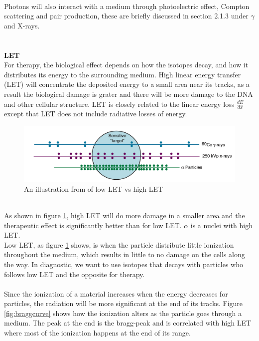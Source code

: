 \documentclass[twoside,english]{uiofysmaster/uiofysmaster}
\begin{document}
\\
Photons will also interact with a medium through photoelectric effect, Compton scattering and pair production, these are briefly discussed in section 2.1.3 under $\gamma$ and X-rays.\\
\\
\\
\noindent
\textbf{LET}\\
For therapy, the biological effect depends on how the isotopes decay, and how it distributes its energy to the surrounding medium. High linear energy transfer (LET) will concentrate the deposited energy to a small area near its tracks, as a result the biological damage is grater and there will be more damage to the DNA and other cellular structure. LET is closely related to the linear energy loss $\frac{dE}{dx}$ except that LET does not include radiative losses of energy. \\
\begin{figure}[h]
    \centering
    \includegraphics[scale=.4]{low_vs_high_LET.PNG}
    \caption{An illustration from \cite{Zeman2015_chap1} of low LET vs high LET}
    \label{fig:higvslowLET}
\end{figure}
\\
As shown in figure \ref{fig:higvslowLET}, high LET will do more damage in a smaller area and the therapeutic effect is significantly better than for low LET. $\alpha$ is a nuclei with high LET. \\
Low LET, as figure \ref{fig:higvslowLET} shows, is when the particle distribute little ionization throughout the medium, which results in little to no damage on the cells along the way. In diagnostic, we want to use isotopes that decays with particles who follows low LET and the opposite for therapy.\\
\\
Since the ionization of a material increases when the energy decreases for particles\cite{Nuclear_medicine}, the radiation will be more significant at the end of its tracks. Figure \ref{fig:braggcurve} shows how the ionization alters as the particle goes through a medium. The peak at the end is the bragg-peak and is correlated with high LET where most of the ionization happens at the end of its range. 
\end{document}

